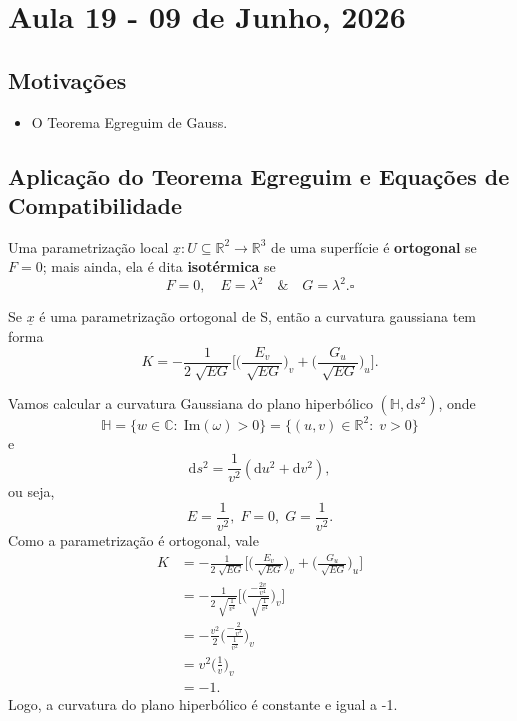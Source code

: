 \documentclass[../differential_geometry.tex]{subfiles}
\begin{document}
\section{Aula 19 - 09 de Junho, 2026}
\subsection{Motivações}
\begin{itemize}
	\item O Teorema Egreguim de Gauss.
\end{itemize}
\subsection{Aplicação do Teorema Egreguim e Equações de Compatibilidade}
\begin{def*}
	Uma parametrização local \(\underline{x}:U\subseteq \mathbb{R}^{2}\rightarrow \mathbb{R}^{3}\) de uma superfície é \textbf{ortogonal} se \(F=0\); mais ainda, ela é dita \textbf{isotérmica} se
	\[
		F = 0, \quad E = \lambda^{2} \quad\&\quad G = \lambda^{2}. \square
	\]
\end{def*}
\begin{prop*}
	Se \(\underline{x}\) é uma parametrização ortogonal de S, então a curvatura gaussiana tem forma
	\[
		K = -\frac{1}{2\sqrt[]{EG}}\biggl[\biggl(\frac{E_{v}}{\sqrt[]{EG}}\biggr)_{v} + \biggl(\frac{G_{u}}{\sqrt[]{EG}}\biggr)_{u}\biggr].
	\]
\end{prop*}
\begin{example}
	Vamos calcular a curvatura Gaussiana do plano hiperbólico \((\mathbb{H}, \mathrm{d}s^{2})\), onde
	\[
		\mathbb{H}=\{w\in \mathbb{C}:\; \mathrm{Im}(\omega )>0\} = \{(u, v)\in \mathbb{R}^{2}:\; v > 0\}
	\]
	e
	\[
		\mathrm{d}s^{2} = \frac{1}{v^{2}}(\mathrm{d}u^{2}+\mathrm{d}v^{2}),
	\]
	ou seja,
	\[
		E = \frac{1}{v^{2}},\; F = 0,\; G = \frac{1}{v^{2}}.
	\]
	Como a parametrização é ortogonal, vale
	\begin{align*}
		K & = - \frac{1}{2\sqrt[]{EG}}\biggl[\biggl(\frac{E_{v}}{\sqrt[]{EG}}\biggr)_{v} + \biggl(\frac{G_{u}}{\sqrt[]{EG}}\biggr)_{u}\biggr] \\
		  & = -\frac{1}{2\sqrt[]{\frac{1}{v^{4}}}}\biggl[\biggl(\frac{-\frac{2v}{v^{4}}}{\sqrt[]{\frac{1}{v^{4}}}}\biggr)_{v}\biggr]          \\
		  & =-\frac{v^{2}}{2}\biggl(\frac{-\frac{2}{v^{3}}}{\frac{1}{v^{2}}}\biggr)_{v}                                                       \\
		  & = v^{2}\biggl(\frac{1}{v}\biggr)_{v}                                                                                              \\
		  & = -1.
	\end{align*}
	Logo, a curvatura do plano hiperbólico é constante e igual a -1.
\end{example}
\end{document}
